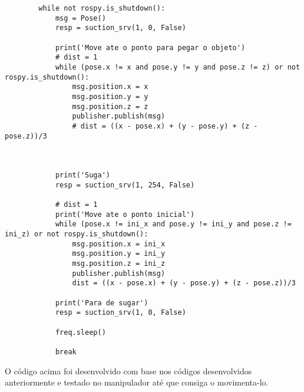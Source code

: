 \begin{lstlisting}
        while not rospy.is_shutdown():
            msg = Pose()
            resp = suction_srv(1, 0, False)

            print('Move ate o ponto para pegar o objeto')
            # dist = 1
            while (pose.x != x and pose.y != y and pose.z != z) or not rospy.is_shutdown():
                msg.position.x = x
                msg.position.y = y
                msg.position.z = z
                publisher.publish(msg)
                # dist = ((x - pose.x) + (y - pose.y) + (z - pose.z))/3

                

            print('Suga')
            resp = suction_srv(1, 254, False)

            # dist = 1
            print('Move ate o ponto inicial')
            while (pose.x != ini_x and pose.y != ini_y and pose.z != ini_z) or not rospy.is_shutdown():
                msg.position.x = ini_x
                msg.position.y = ini_y
                msg.position.z = ini_z
                publisher.publish(msg)
                dist = ((x - pose.x) + (y - pose.y) + (z - pose.z))/3

            print('Para de sugar')
            resp = suction_srv(1, 0, False)

            freq.sleep()

            break
\end{lstlisting}

O código acima foi desenvolvido com base nos códigos desenvolvidos anteriormente e testado no manipulador até que consiga o movimenta-lo.